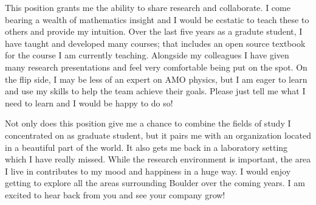 \documentclass[12pt, letter]{awesome-cv}
\begin{document}
\begin{cvletter}
This position grants me the ability to share research and collaborate. I come bearing a wealth of mathematics insight and I would be ecstatic to teach these to others and provide my intuition. Over the last five years as a gradute student, I have taught and developed many courses; that includes an open source textbook for the course I am currently teaching. Alongside my colleagues I have given many research presentations and feel very comfortable being put on the spot. On the flip side, I may be less of an expert on AMO physics, but I am eager to learn and use my skills to help the team achieve their goals. Please just tell me what I need to learn and I would be happy to do so!

Not only does this position give me a chance to combine the fields of study I concentrated on as graduate student, but it pairs me with an organization located in a beautiful part of the world. It also gets me back in a laboratory setting which I have really missed. While the research environment is important, the area I live in contributes to my mood and happiness in a huge way. I would enjoy getting to explore all the areas surrounding Boulder over the coming years. I am excited to hear back from you and see your company grow! 

\end{cvletter}

\makeletterclosing
\end{document}
